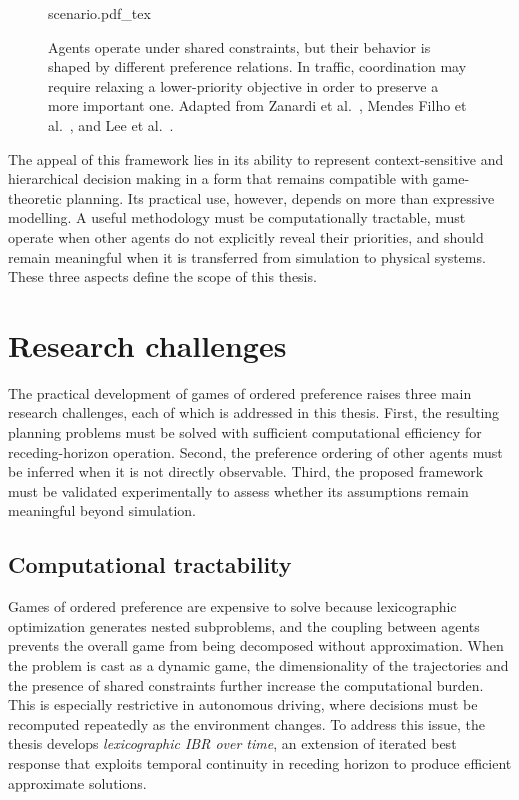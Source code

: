 \begin{figure}[!t]
\centering
\def\svgwidth{0.6\linewidth}
{scenario.pdf_tex}
\caption{Agents operate under shared constraints, but their behavior is
shaped by different preference relations. In traffic, coordination may
require relaxing a lower-priority objective in order to preserve a more
important one. Adapted from Zanardi et al.~\protect\cite{zanardi:2022},
Mendes Filho et al.~\protect\cite{filho:2017}, and Lee et
al.~\protect\cite{lee:2025}.}
\label{fig:scenario}
\end{figure}

The appeal of this framework lies in its ability to represent
context-sensitive and hierarchical decision making in a form that remains
compatible with game-theoretic planning. Its practical use, however,
depends on more than expressive modelling. A useful methodology must be
computationally tractable, must operate when other agents do not
explicitly reveal their priorities, and should remain meaningful when it
is transferred from simulation to physical systems. These three aspects
define the scope of this thesis.

\section{Research challenges}

The practical development of games of ordered preference raises three
main research challenges, each of which is addressed in this thesis.
First, the resulting planning problems must be solved with sufficient
computational efficiency for receding-horizon operation. Second, the
preference ordering of other agents must be inferred when it is not
directly observable. Third, the proposed framework must be validated
experimentally to assess whether its assumptions remain meaningful
beyond simulation.

\subsection{Computational tractability}

Games of ordered preference are expensive to solve because lexicographic
optimization generates nested subproblems, and the coupling between agents
prevents the overall game from being decomposed without approximation.
When the problem is cast as a dynamic game, the dimensionality of the
trajectories and the presence of shared constraints further increase the
computational burden. This is especially restrictive in autonomous
driving, where decisions must be recomputed repeatedly as the environment
changes. To address this issue, the thesis develops
\emph{lexicographic IBR over time}, an extension of iterated best response
that exploits temporal continuity in receding horizon to produce efficient
approximate solutions.

